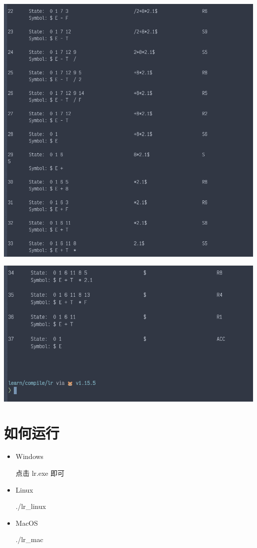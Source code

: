 \documentclass[fontset=none,UTF8,a4paper,zihao=-4]{ctexart}
\begin{document}
\begin{itemize}
\begin{center}
\includegraphics[width=.9\linewidth]{运行截图/2020-11-26_00-49-14_screenshot.png}
\end{center}

\begin{center}
\includegraphics[width=.9\linewidth]{运行截图/2020-11-26_00-49-23_screenshot.png}
\end{center}
\end{itemize}

\section{如何运行}
\label{sec:org99a2ae6}
\begin{itemize}
\item Windows

点击 lr.exe 即可

\item Linux

./lr\_linux

\item MacOS

./lr\_mac
\end{itemize}
\end{document}
